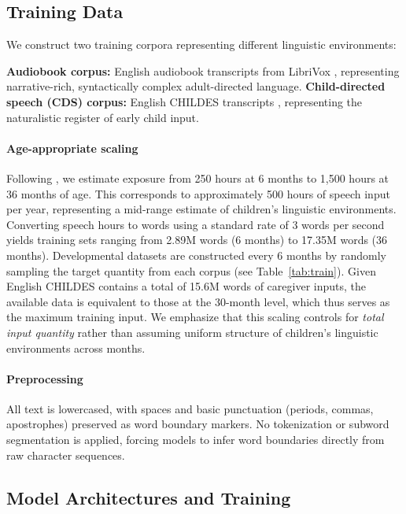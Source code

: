 \subsection{Training Data}

We construct two training corpora representing different linguistic environments:

\noindent\textbf{Audiobook corpus:} English audiobook transcripts from LibriVox \citep{kearns2014librivox}, representing narrative-rich, syntactically complex adult-directed language. \noindent\textbf{Child-directed speech (CDS) corpus:} English CHILDES transcripts \citep{macwhinney2000childes}, representing the naturalistic register of early child input.


\paragraph{Age-appropriate scaling} Following \citet{cristia2019child}, we estimate exposure from 250 hours at 6 months to 1,500 hours at 36 months of age. This corresponds to approximately 500 hours of speech input per year, representing a mid-range estimate of children's linguistic environments. Converting speech hours to words using a standard rate of 3 words per second yields training sets ranging from 2.89M words (6 months) to 17.35M words (36 months). Developmental datasets are constructed every 6 months by randomly sampling the target quantity from each corpus (see Table~\ref{tab:train}). Given English CHILDES contains a total of 15.6M words of caregiver inputs, the available data is equivalent to those at the 30-month level, which thus serves as the maximum training input. We emphasize that this scaling controls for \emph{total input quantity} rather than assuming uniform structure of children’s linguistic environments across months.



\paragraph{Preprocessing} All text is lowercased, with spaces and basic punctuation (periods, commas, apostrophes) preserved as word boundary markers. No tokenization or subword segmentation is applied, forcing models to infer word boundaries directly from raw character sequences.

\subsection{Model Architectures and Training}

